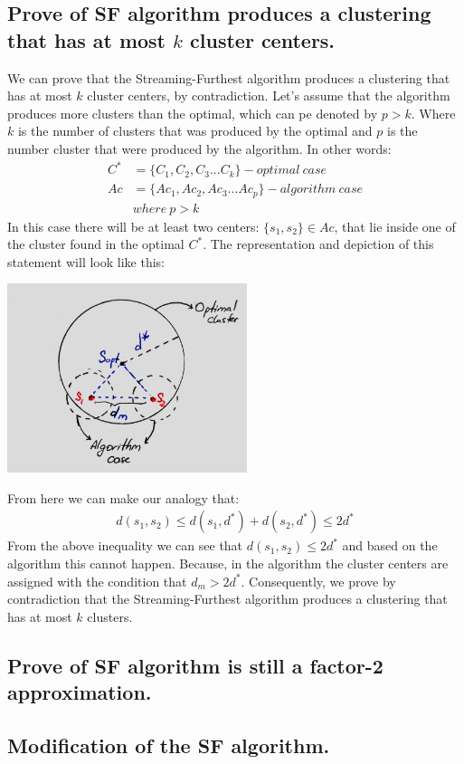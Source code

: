 \documentclass[11pt,a4paper,english]{article}
\begin{document}
      \subsection{Prove of SF algorithm produces a clustering that has at most $k$ cluster centers.}
        We can prove that the Streaming-Furthest algorithm produces a clustering that has at most $k$ cluster centers, by contradiction. Let's assume that the algorithm produces more clusters than the optimal, which can pe denoted by $p > k$. Where $k$ is the number of clusters that was produced by the optimal and $p$ is the number cluster that were produced by the algorithm. In other words:
        \begin{align*}
          C^* & = \{C_1, C_2, C_3 ... C_k\} - optimal\ case \\
          Ac & = \{Ac_1, Ac_2, Ac_3 ... Ac_p\} - algorithm\ case \\
          & where \ p > k
        \end{align*}
        In this case there will be at least two centers: $\{s_1, s_2\} \in Ac $, that lie inside one of the cluster found in the optimal $C^*$.
        The representation and depiction of this statement will look like this:
        \begin{center}
          \includegraphics[width=7cm]{sc_8.png}
        \end{center}
        From here we can make our analogy that:
        \begin{align*}
          d(s_1, s_2) \leq d(s_1, d^*) + d(s_2, d^*) \leq 2d^*
        \end{align*}
        From the above inequality we can see that $d(s_1, s_2) \leq 2d^*$ and based on the algorithm this cannot happen. Because, in the algorithm the cluster centers are assigned with the condition that $d_m > 2d^*$. Consequently, we prove by contradiction that the Streaming-Furthest algorithm produces a clustering that has at most $k$ clusters.
      \subsection{Prove of SF algorithm is still a factor-2 approximation.}
      \subsection{Modification of the SF algorithm.}
\end{document}
